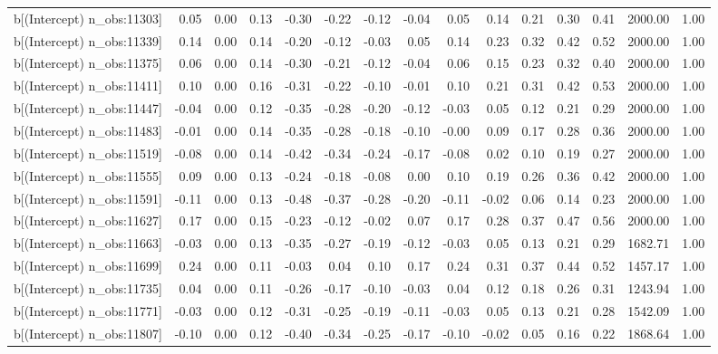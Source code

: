 \begin{table}[ht]
\begin{tabular}{rrrrrrrrrrrrrrr}
  b[(Intercept) n\_obs:11303] & 0.05 & 0.00 & 0.13 & -0.30 & -0.22 & -0.12 & -0.04 & 0.05 & 0.14 & 0.21 & 0.30 & 0.41 & 2000.00 & 1.00 \\ 
  b[(Intercept) n\_obs:11339] & 0.14 & 0.00 & 0.14 & -0.20 & -0.12 & -0.03 & 0.05 & 0.14 & 0.23 & 0.32 & 0.42 & 0.52 & 2000.00 & 1.00 \\ 
  b[(Intercept) n\_obs:11375] & 0.06 & 0.00 & 0.14 & -0.30 & -0.21 & -0.12 & -0.04 & 0.06 & 0.15 & 0.23 & 0.32 & 0.40 & 2000.00 & 1.00 \\ 
  b[(Intercept) n\_obs:11411] & 0.10 & 0.00 & 0.16 & -0.31 & -0.22 & -0.10 & -0.01 & 0.10 & 0.21 & 0.31 & 0.42 & 0.53 & 2000.00 & 1.00 \\ 
  b[(Intercept) n\_obs:11447] & -0.04 & 0.00 & 0.12 & -0.35 & -0.28 & -0.20 & -0.12 & -0.03 & 0.05 & 0.12 & 0.21 & 0.29 & 2000.00 & 1.00 \\ 
  b[(Intercept) n\_obs:11483] & -0.01 & 0.00 & 0.14 & -0.35 & -0.28 & -0.18 & -0.10 & -0.00 & 0.09 & 0.17 & 0.28 & 0.36 & 2000.00 & 1.00 \\ 
  b[(Intercept) n\_obs:11519] & -0.08 & 0.00 & 0.14 & -0.42 & -0.34 & -0.24 & -0.17 & -0.08 & 0.02 & 0.10 & 0.19 & 0.27 & 2000.00 & 1.00 \\ 
  b[(Intercept) n\_obs:11555] & 0.09 & 0.00 & 0.13 & -0.24 & -0.18 & -0.08 & 0.00 & 0.10 & 0.19 & 0.26 & 0.36 & 0.42 & 2000.00 & 1.00 \\ 
  b[(Intercept) n\_obs:11591] & -0.11 & 0.00 & 0.13 & -0.48 & -0.37 & -0.28 & -0.20 & -0.11 & -0.02 & 0.06 & 0.14 & 0.23 & 2000.00 & 1.00 \\ 
  b[(Intercept) n\_obs:11627] & 0.17 & 0.00 & 0.15 & -0.23 & -0.12 & -0.02 & 0.07 & 0.17 & 0.28 & 0.37 & 0.47 & 0.56 & 2000.00 & 1.00 \\ 
  b[(Intercept) n\_obs:11663] & -0.03 & 0.00 & 0.13 & -0.35 & -0.27 & -0.19 & -0.12 & -0.03 & 0.05 & 0.13 & 0.21 & 0.29 & 1682.71 & 1.00 \\ 
  b[(Intercept) n\_obs:11699] & 0.24 & 0.00 & 0.11 & -0.03 & 0.04 & 0.10 & 0.17 & 0.24 & 0.31 & 0.37 & 0.44 & 0.52 & 1457.17 & 1.00 \\ 
  b[(Intercept) n\_obs:11735] & 0.04 & 0.00 & 0.11 & -0.26 & -0.17 & -0.10 & -0.03 & 0.04 & 0.12 & 0.18 & 0.26 & 0.31 & 1243.94 & 1.00 \\ 
  b[(Intercept) n\_obs:11771] & -0.03 & 0.00 & 0.12 & -0.31 & -0.25 & -0.19 & -0.11 & -0.03 & 0.05 & 0.13 & 0.21 & 0.28 & 1542.09 & 1.00 \\ 
  b[(Intercept) n\_obs:11807] & -0.10 & 0.00 & 0.12 & -0.40 & -0.34 & -0.25 & -0.17 & -0.10 & -0.02 & 0.05 & 0.16 & 0.22 & 1868.64 & 1.00 \\ 

\end{tabular}
\end{table}
